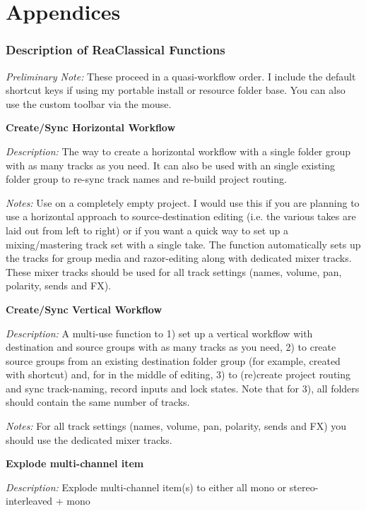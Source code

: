 \documentclass[10pt,american]{article}
\begin{document}
\pagebreak{}

\appendix

\part{Appendices}

\section{Description of ReaClassical Functions}

\emph{Preliminary Note: }These proceed in a quasi-workflow order. I include the
default shortcut keys if using my portable install or resource folder base. You
can also use the custom toolbar via the mouse. 

\textbf{Create/Sync Horizontal Workflow }

\emph{Description: }The way to create a horizontal workflow with a single folder
group with as many tracks as you need. It can also be used with an single
existing folder group to re-sync track names and re-build project routing.

\emph{Notes: }Use on a completely empty project. I would use this if you are
planning to use a horizontal approach to source-destination editing (i.e. the
various takes are laid out from left to right) or if you want a quick way to set
up a mixing/mastering track set with a single take. The function automatically
sets up the tracks for group media and razor-editing along with dedicated mixer
tracks. These mixer tracks should be used for all track settings (names, volume,
pan, polarity, sends and FX).

\textbf{Create/Sync Vertical Workflow }

\emph{Description: }A multi-use function to 1) set up a vertical workflow with
destination and source groups with as many tracks as you need, 2) to create
source groups from an existing destination folder group (for example, created
with  shortcut) and, for in the middle of editing, 3) to (re)create
project routing and sync track-naming, record inputs and lock states. Note that
for 3), all folders should contain the same number of tracks.

\emph{Notes: }For all track settings (names, volume, pan, polarity, sends and
FX) you should use the dedicated mixer tracks.

\textbf{Explode multi-channel item }

\emph{Description:} Explode multi-channel item(s) to either all mono or
stereo-interleaved + mono
\end{document}
